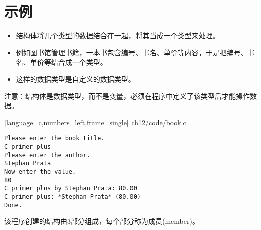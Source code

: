 \section{示例}

\begin{frame}[fragile]\ft{\secname}
  \begin{itemize}
  \item  结构体将几个类型的数据结合在一起，将其当成一个类型来处理。
  \item[] 例如图书馆管理书籍，一本书包含编号、书名、单价等内容，于是把编号、书名、单价等结合成一个类型。
  \item 这样的数据类型是自定义的数据类型。
  \end{itemize}

注意：结构体是数据类型，而不是变量，必须在程序中定义了该类型后才能操作数据。
\end{frame}


\begin{frame}\ft{\secname}

[language=c,numbers=left,frame=single]
{ch12/code/book.c}
\end{frame}

\begin{frame}[fragile]\ft{\secname}
  \begin{lstlisting}[backgroundcolor=\color{blue!20}]
Please enter the book title.
C primer plus
Please enter the author.
Stephan Prata
Now enter the value.
80
C primer plus by Stephan Prata: 80.00
C primer plus: *Stephan Prata* (80.00)
Done.    
  \end{lstlisting}
\end{frame}

\begin{frame}[fragile]\ft{\secname}
该程序创建的结构由3部分组成，每个部分称为成员{\tf (member)}。
\end{frame}

